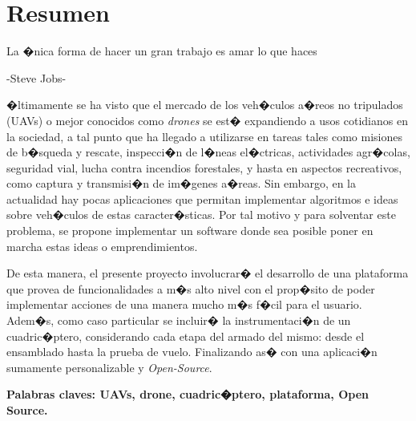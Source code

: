 %
%
%
%
%

\chapter{Resumen}

\begin{FraseCelebre}
\begin{Frase}
La �nica forma de hacer un gran trabajo es amar lo que haces
\end{Frase}
\begin{Fuente}
-Steve Jobs-
\end{Fuente}
\end{FraseCelebre}

�ltimamente se ha visto que el mercado de los veh�culos a�reos no tripulados (UAVs) o mejor conocidos como \textit{drones} se est� expandiendo a usos cotidianos en la sociedad, a tal punto que ha llegado a utilizarse en tareas tales como misiones de b�squeda y rescate, inspecci�n de l�neas el�ctricas, actividades agr�colas, seguridad vial, lucha contra incendios forestales, y hasta en aspectos recreativos, como captura y transmisi�n de im�genes a�reas. Sin embargo, en la actualidad hay pocas aplicaciones que permitan implementar algoritmos e ideas sobre veh�culos de estas caracter�sticas. Por tal motivo y para solventar este problema, se propone implementar un software donde sea posible poner en marcha estas ideas o emprendimientos. 

De esta manera, el presente proyecto involucrar� el desarrollo de una plataforma que provea de funcionalidades a m�s alto nivel con el prop�sito de poder implementar acciones de una manera mucho m�s f�cil para el usuario. Adem�s, como caso  particular se incluir� la instrumentaci�n de un cuadric�ptero, considerando cada etapa del armado del mismo: desde el ensamblado hasta la prueba de vuelo.  Finalizando as� con una aplicaci�n sumamente personalizable y \textit{Open-Source}. 

\smallskip
\noindent \textbf{Palabras claves: UAVs, drone, cuadric�ptero, plataforma, Open Source.} 

\endinput
